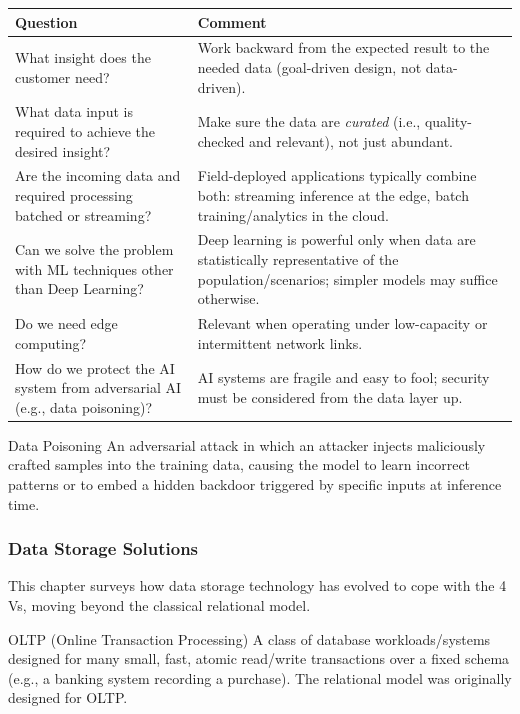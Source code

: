 \begin{center}
\begin{tabular}{p{5.5cm}p{7.5cm}}
\toprule
\textbf{Question} & \textbf{Comment} \\
\midrule
What insight does the customer need? & Work backward from the expected result to the needed data (goal-driven design, not data-driven). \\[0.2cm]
What data input is required to achieve the desired insight? & Make sure the data are \emph{curated} (i.e., quality-checked and relevant), not just abundant. \\[0.2cm]
Are the incoming data and required processing batched or streaming? & Field-deployed applications typically combine both: streaming inference at the edge, batch training/analytics in the cloud. \\[0.2cm]
Can we solve the problem with ML techniques other than Deep Learning? & Deep learning is powerful only when data are statistically representative of the population/scenarios; simpler models may suffice otherwise. \\[0.2cm]
Do we need edge computing? & Relevant when operating under low-capacity or intermittent network links. \\[0.2cm]
How do we protect the AI system from adversarial AI (e.g., data poisoning)? & AI systems are fragile and easy to fool; security must be considered from the data layer up. \\
\bottomrule
\end{tabular}
\end{center}

\begin{defbox}{Data Poisoning}
An adversarial attack in which an attacker injects maliciously crafted samples into the training data, causing the model to learn incorrect patterns or to embed a hidden backdoor triggered by specific inputs at inference time.
\end{defbox}



\subsubsection{Data Storage Solutions}

This chapter surveys how data storage technology has evolved to cope with the 4 Vs, moving beyond the classical relational model.

\begin{defbox}{OLTP (Online Transaction Processing)}
A class of database workloads/systems designed for many small, fast, atomic read/write transactions over a fixed schema (e.g., a banking system recording a purchase). The relational model was originally designed for OLTP.
\end{defbox}

